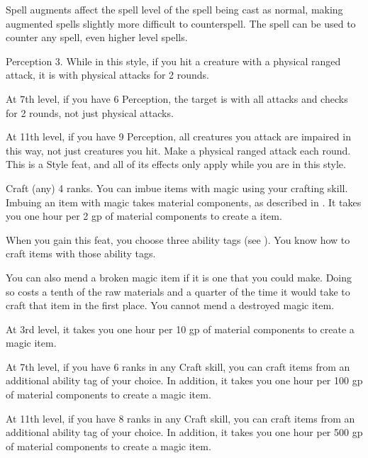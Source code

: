     Spell augments affect the spell level of the spell being cast as normal, making augmented spells slightly more difficult to counterspell.
    The  spell can be used to counter any spell, even higher level spells.

    \featpres Perception 3.
    \featben While in this style, if you hit a creature with a physical ranged attack, it is \impaired with physical attacks for 2 rounds.

    At 7th level, if you have 6 Perception, the target is \impaired with all attacks and checks for 2 rounds, not just physical attacks.

    At 11th level, if you have 9 Perception, all creatures you attack are impaired in this way, not just creatures you hit.
    \stylereq Make a physical ranged attack each round.
     This is a Style feat, and all of its effects only apply while you are in this style.

    \featpre Craft (any) 4 ranks.
    \featben You can imbue items with magic using your crafting skill.
    Imbuing an item with magic takes material components, as described in .
    It takes you one hour per 2 gp of material components to create a item.

    When you gain this feat, you choose three ability tags (see ).
    You know how to craft items with those ability tags.

    You can also mend a broken magic item if it is one that you could make.
    Doing so costs a tenth of the raw materials and a quarter of the time it would take to craft that item in the first place.
    You cannot mend a destroyed magic item.

    At 3rd level, it takes you one hour per 10 gp of material components to create a magic item. %

    At 7th level, if you have 6 ranks in any Craft skill, you can craft items from an additional ability tag of your choice.
    In addition, it takes you one hour per 100 gp of material components to create a magic item. %

    At 11th level, if you have 8 ranks in any Craft skill, you can craft items from an additional ability tag of your choice. In addition, it takes you one hour per 500 gp of material components to create a magic item. %


